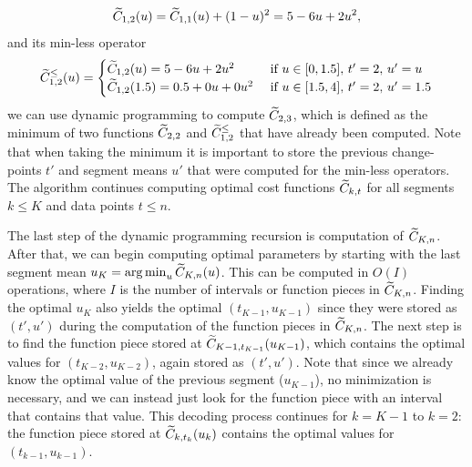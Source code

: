 \documentclass{article}
\DeclareMathOperator*{\argmin}{arg\,min}
\begin{document}
\begin{equation}
  \widetilde{C}_{1,2}(u) = \widetilde{C}_{1,1}(u)+(1-u)^2=5 - 6u + 2u^2,
\end{equation}
and its min-less operator
\begin{equation}
  \widetilde{C}^\leq_{1,2}(u) =
  \begin{cases}
    \widetilde{C}_{1,2}(u)=5-6u + 2u^2 & \text{ if }u\in[0, 1.5],\, t'=2,\, u'=u\\
    \widetilde{C}_{1,2}(1.5)=0.5 + 0u +0u^2 & \text{ if }u\in[1.5, 4],\, t'=2,\, u'=1.5
  \end{cases}
\end{equation}
we can use dynamic programming to compute $\widetilde{C}_{2,3}$, which is
defined as the minimum of two functions $\widetilde{C}_{2,2}$ and
$\widetilde{C}_{1,2}^\leq$ that have already been computed. Note that when
taking the minimum it is important to store the previous
change-points $t'$ and segment means $u'$ that were computed for the
min-less operators. The algorithm continues computing optimal cost
functions $\widetilde{C}_{k,t}$ for all segments $k\leq K$ and data points
$t\leq n$.

The last step of the dynamic programming recursion is computation of
$\widetilde{C}_{K,n}$. After that, we can begin computing optimal parameters
by starting with the last segment mean
$u_K = \argmin_u \FCC_{K,n}(u)$. This can be computed in $O(I)$
operations, where $I$ is the number of intervals or function pieces in
$\widetilde{C}_{K,n}$. Finding the optimal $u_K$ also yields the optimal
$(t_{K-1},u_{K-1})$ since they were stored as $(t',u')$ during the
computation of the function pieces in $\widetilde{C}_{K,n}$. The next step is
to find the function piece stored at $\widetilde{C}_{K-1,t_{K-1}}(u_{K-1})$,
which contains the optimal values for $(t_{K-2},u_{K-2})$, again
stored as $(t',u')$. Note that since we already know the optimal value
of the previous segment ($u_{K-1}$), no minimization is necessary,
and we can instead just look for the function piece with an interval
that contains that value. This decoding process continues for $k=K-1$
to $k=2$: the function piece stored at $\widetilde{C}_{k,t_{k}}(u_{k})$ 
contains the optimal values for $(t_{k-1},u_{k-1})$.
\end{document}
